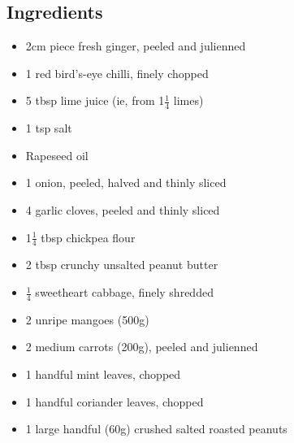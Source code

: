 \documentclass{book}
\begin{document}
\subsection*{Ingredients}
\begin{itemize}
\item 2cm piece fresh ginger, peeled and julienned
\item 1 red bird’s-eye chilli, finely chopped
\item 5 tbsp lime juice (ie, from 1$\frac{1}{4}$ limes) 
\item 1 tsp salt 
\item Rapeseed oil 
\item 1 onion, peeled, halved and thinly sliced 
\item 4 garlic cloves, peeled and thinly sliced 
\item 1$\frac{1}{4}$ tbsp chickpea flour 
\item 2 tbsp crunchy unsalted peanut butter
\item $\frac{1}{4}$ sweetheart cabbage, finely shredded 
\item 2 unripe mangoes (500g) 
\item 2 medium carrots (200g), peeled and julienned 
\item 1 handful mint leaves, chopped 
\item 1 handful coriander leaves, chopped 
\item 1 large handful (60g) crushed salted roasted peanuts
\end{itemize}
\end{document}
